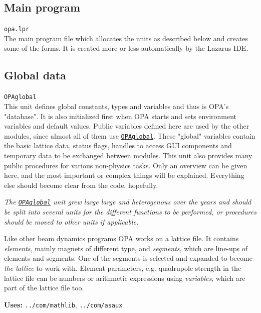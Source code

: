 \documentclass[12pt]{article}
\newcommand\code[1]{{\tt #1}}
\newcommand{\opauni}[1]{\colorbox{orange!30}{\code{#1}}}
\newcommand{\ounih}[2]{\subsection{\label{#2}#1}{\Huge\opauni{#2}}\\}
\newcommand{\ouni}[1]{\hyperref[#1]{\opauni{#1}}}
\newcommand{\uses}[1]{{\bf Uses: } #1}
\newcommand{\desc}[1]{#1}
\newcommand{\todo}[1]{{\color{red}\em #1}}
\begin{document}
\ounih{Main program}{{opa.lpr}}

\desc{The main program file which allocates the units as described below and creates some of the forms. It is created more or less automatically by the Lazarus IDE.}


\ounih{Global data}{OPAglobal}

\desc{
This unit defines global constants, types and variables and thus is OPA's "database". It is also initialized first when OPA starts and sets environment variables and default values. Public variables defined here are used by the other modules, since almost all of them use \ouni{OPAglobal}. These "global" variables contain the basic lattice data, status flags, handles to access GUI components and temporary data to be exchanged between modules. This unit also provides many public procedures for various non-physics tasks. Only an overview can be given here, and the most important or complex things will be explained. Everything else should become clear from the code, hopefully.

\todo{The \ouni{OPAglobal} unit grew large large and heterogenous over the years and should be split into several units for the different functions to be performed, or procedures should be moved to other units if applicable.}

Like other beam dynamics programs OPA works on a lattice file. It contains {\em elements}, mainly magnets of different type, and {\em segments}, which are line-ups of elements and segments. One of the segments is selected and expanded to become {\em the lattice} to work with. Element parameters, e.g. quadrupole strength in the lattice file can be numbers or arithmetic expressions using {\em variables}, which are part of the lattice file too.
}

\uses{\opauni{../com/mathlib}, \opauni{../com/asaux}}
\end{document}
